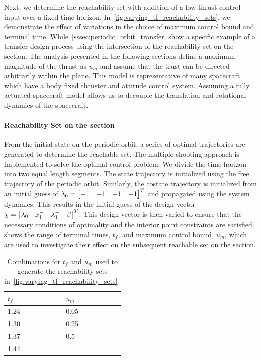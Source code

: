 Next, we determine the reachability set with addition of a low-thrust control input over a fixed time horizon.
In~\cref{fig:varying_tf_reachability_sets}, we demonstrate the effect of variations in the choice of maximum control bound and terminal time.
While~\cref{sssec:periodic_orbit_transfer} show a specific example of a transfer design process using the intersection of the reachability set on the \Poincare section.
The analysis presented in the following sections define a maximum magnitude of the thrust as \( u_{m} \) and assume that the trust can be directed arbitrarily within the plane. 
This model is representative of many spacecraft which have a body fixed thruster and attitude control system.
Assuming a fully actuated spacecraft model allows us to decouple the translation and rotational dynamics of the spacecraft.

\paragraph{Reachability Set on the \Poincare section}
From the initial state on the periodic orbit, a series of optimal trajectories are generated to determine the reachable set.
The multiple shooting approach is implemented to solve the optimal control problem. 
We divide the time horizon into two equal length segments. 
The state trajectory is initialized using the free trajectory of the periodic orbit. 
Similarly, the costate trajectory is initialized from an initial guess of \( \lambda_0 = \begin{bmatrix} -1 & -1 & -1 & -1\end{bmatrix}^T\) and propagated using the system dynamics.
This results in the initial guess of the design vector \( \chi = \begin{bmatrix} \lambda_0 & x_1^{-} & \lambda_1^{-} & \beta \end{bmatrix}^T\).
This design vector is then varied to ensure that the necessary conditions of optimality and the interior point constraints are satisfied. 
 shows the range of terminal times, \( t_f \), and maximum control bound, \( u_m \), which are used to investigate their effect on the subsequent reachable set on the \Poincare section.
\begin{table}
    \centering
    \begin{tabular}{ll}  
        \toprule
        \(t_f\) & \( u_m \) \\
        \midrule
        1.24 & 0.05 \\
        1.30 & 0.25 \\
        1.37 & 0.5 \\
        1.44 & \\
        \bottomrule
    \end{tabular}
    \caption{Combinations for \( t_f \) and \( u_m\) used to generate the reachability sets in~\cref{fig:varying_tf_reachability_sets}~\label{tab:varying_tf}}
\end{table}


